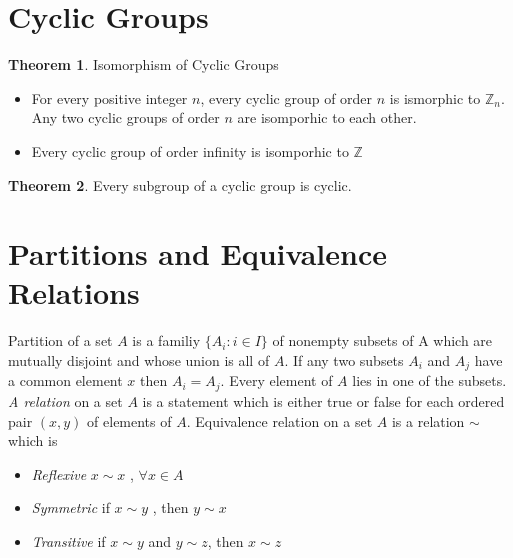 \documentclass[a4paper,12pt]{article}
\theoremstyle{definition}
\theoremstyle{axiom}
\theoremstyle{theorem}
\newtheorem{theorem}{Theorem}[section]
\begin{document}
\section{Cyclic Groups}
\begin{theorem}{Isomorphism of Cyclic Groups}
\begin{itemize}
        \item For every positive integer $n$, every cyclic group of order $n$ is ismorphic to $\mathbb{Z}_n$. Any two cyclic groups of order $n$ are isomporhic to each other. 
       \item Every cyclic group of order infinity is isomporhic to $\mathbb{Z}$
\end{itemize} 
\end{theorem}
\begin{theorem}{}
        Every subgroup of a cyclic group is cyclic.
\end{theorem}
\section{Partitions and Equivalence Relations}
Partition of a set $A$ is a familiy $\{ A_i : i \in I \}$ of nonempty subsets of A which are mutually disjoint and whose union is all of $A$. If any two subsets $A_i$ and $A_j$ have a common element $x$ then $A_i = A_j$. Every element of $A$ lies in one of the subsets.
\\
\textit{A relation} on a set $A$ is a statement which is either true or false for each ordered pair $(x, y)$ of elements of $A$.
Equivalence relation on a set $A$ is a relation $\sim$ which is 
\begin{itemize}
    \item \textit{Reflexive} $x \sim x$ , $\forall x \in A$
    \item \textit{Symmetric} if $x \sim y$ , then $y \sim x$
    \item \textit{Transitive} if $x \sim y$ and $y \sim z$, then $x \sim z$
\end{itemize}
\end{document}
